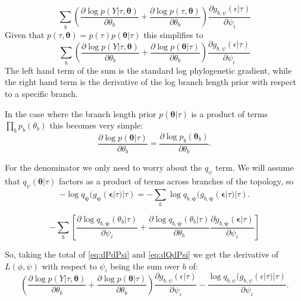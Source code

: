 \documentclass{article}
\begin{document}
\begin{equation}
    \sum_b
    \left(
        \frac{\partial \log p(Y | \tau, \bm\theta)}{\partial \theta_b}
        +
        \frac{\partial \log p(\tau, \bm\theta)}{\partial \theta_b}
    \right)
    \frac{\partial g_{b,\psi}(\epsilon | \tau)}{\partial \psi_i}
    \label{eq:dLdPsi}
\end{equation}
Given that $p(\tau, \bm\theta) = p(\tau) p(\bm\theta | \tau)$ this simplifies to
\begin{equation}
    \sum_b
    \left(
        \frac{\partial \log p(Y | \tau, \bm\theta)}{\partial \theta_b}
        +
        \frac{\partial \log p(\bm\theta | \tau)}{\partial \theta_b}
    \right)
    \frac{\partial g_{b,\psi}(\epsilon | \tau)}{\partial \psi_i}
    \label{eq:dPdPsi}
\end{equation}
The left hand term of the sum is the standard log phylogenetic gradient, while the right hand term is the derivative of the log branch length prior with respect to a specific branch.

In the case where the branch length prior $p(\bm\theta | \tau)$ is a product of terms $\prod_b p_b(\theta_b)$ this becomes very simple:
\[
    \frac{\partial \log p(\bm\theta | \tau)}{\partial \theta_b} =
    \frac{\partial \log p_b(\bm\theta_b)}{\partial \theta_b}.
\]

For the denominator we only need to worry about the $q_\psi$ term.
We will assume that $q_\psi(\bm\theta | \tau)$ factors as a product of terms across branches of the topology, so
\[
    - \log q_{\bm{\psi}}(g_{\bm{\psi}}(\bm{\epsilon}|\tau)|\tau) =
    - \sum_b \log q_{b, \bm{\psi}}(g_{b, \bm{\psi}}(\bm{\epsilon}|\tau)|\tau).
\]

\begin{equation}
    - \sum_b
    \left[
        \frac{\partial \log q_{b, \bm{\psi}}(\theta_b | \tau)}{\partial \psi_i} +
        \frac{\partial \log q_{b, \bm{\psi}}(\theta_b | \tau)}{\partial \theta_b}
        \frac{\partial g_{b, \bm{\psi}}(\bm{\epsilon}|\tau)}{\partial \psi_i}
    \right]
    \label{eq:dQdPsi}
\end{equation}

So, taking the total of \eqref{eq:dPdPsi} and \eqref{eq:dQdPsi} we get the derivative of $L(\phi, \psi)$ with respect to $\psi_i$ being the sum over $b$ of:
\begin{equation*}
    \left(
        \frac{\partial \log p(Y | \tau, \bm\theta)}{\partial \theta_b}
        +
        \frac{\partial \log p(\bm\theta | \tau)}{\partial \theta_b}
    \right)
    \frac{\partial g_{b,\psi}(\epsilon | \tau)}{\partial \psi_i}
    - \frac{\log q_{b, \psi}(g_{b, \psi}(\epsilon|\tau)|\tau)}{\partial \psi_i}.
\end{equation*}
\end{document}

